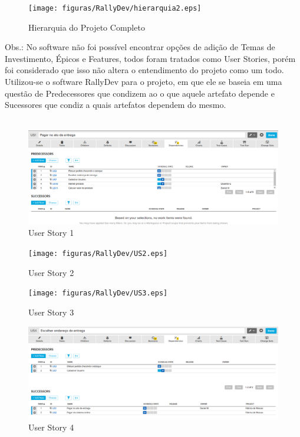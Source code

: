 \begin{figure}[h]
    \centering
    \label{fig01}
        \texttt{[image: figuras/RallyDev/hierarquia2.eps]}
    \caption{Hierarquia do Projeto Completo}
\end{figure}

Obs.: No software não foi possível encontrar opções de adição de Temas de Investimento, Épicos e Features, todos foram tratados como User Stories, porém foi considerado que isso não altera o entendimento do projeto como um todo.\\
\tab Utilizou-se o software RallyDev para o projeto, em que ele se baseia em uma questão de Predecessores que condizem ao o que aquele artefato depende e Sucessores que condiz a quais artefatos dependem do mesmo.\\ \\

\begin{figure}[h]
    \centering
    \label{fig01}
        \includegraphics[keepaspectratio=true,scale=0.3]{figuras/RallyDev/US1.eps}
    \caption{User Story 1}
\end{figure}

\begin{figure}[h]
    \centering
    \label{fig01}
        \texttt{[image: figuras/RallyDev/US2.eps]}
    \caption{User Story 2}
\end{figure}

\begin{figure}[h]
    \centering
    \label{fig01}
        \texttt{[image: figuras/RallyDev/US3.eps]}
    \caption{User Story 3}
\end{figure}

\begin{figure}[h]
    \centering
    \label{fig01}
        \includegraphics[keepaspectratio=true,scale=0.3]{figuras/RallyDev/US4.eps}
    \caption{User Story 4}
\end{figure}

